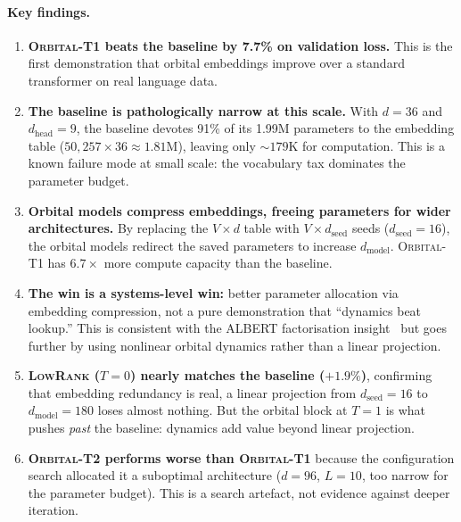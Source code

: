\documentclass[11pt, a4paper]{article}
\theoremstyle{remark}
\begin{document}
\paragraph{Key findings.}
\begin{enumerate}[nosep]
    \item \textbf{\textsc{Orbital-T1} beats the baseline by 7.7\% on validation loss.}
        This is the first demonstration that orbital embeddings improve over a standard transformer on real language data.

    \item \textbf{The baseline is pathologically narrow at this scale.}
        With $d = 36$ and $d_{\text{head}} = 9$, the baseline devotes 91\% of its 1.99M parameters to the embedding table ($50{,}257 \times 36 \approx 1.81\text{M}$), leaving only ${\sim}179\text{K}$ for computation.
        This is a known failure mode at small scale: the vocabulary tax dominates the parameter budget.

    \item \textbf{Orbital models compress embeddings, freeing parameters for wider architectures.}
        By replacing the $V \times d$ table with $V \times d_{\text{seed}}$ seeds ($d_{\text{seed}} = 16$),
        the orbital models redirect the saved parameters to increase $d_{\text{model}}$.
        \textsc{Orbital-T1} has $6.7\times$ more compute capacity than the baseline.

    \item \textbf{The win is a systems-level win:} better parameter allocation via embedding compression, not a pure demonstration that ``dynamics beat lookup.''
        This is consistent with the ALBERT factorisation insight~\cite{lan2020albert} but goes further by using nonlinear orbital dynamics rather than a linear projection.

    \item \textbf{\textsc{LowRank} ($T\!=\!0$) nearly matches the baseline ($+1.9\%$)}, confirming that embedding redundancy is real, a linear projection from $d_{\text{seed}} = 16$ to $d_{\text{model}} = 180$ loses almost nothing.
        But the orbital block at $T = 1$ is what pushes \emph{past} the baseline: dynamics add value beyond linear projection.

    \item \textbf{\textsc{Orbital-T2} performs worse than \textsc{Orbital-T1}} because the configuration search allocated it a suboptimal architecture ($d = 96$, $L = 10$, too narrow for the parameter budget).
        This is a search artefact, not evidence against deeper iteration.


\end{enumerate}
\end{document}
